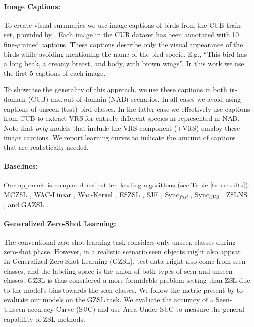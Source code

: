 \documentclass[11pt,a4paper]{article}
\begin{document}
\paragraph{Image Captions:}
To create visual summaries we use image captions of birds from the CUB train-set, provided by \citet{reed2016learning}.  Each image in the CUB dataset has been annotated with 10 fine-grained captions. These captions describe only the visual appearance of the birds while avoiding mentioning the name of the bird specie. E.g., \enquote{This bird has a long beak, a creamy breast, and body, with brown wings}. In this work we use the first 5 captions of each image.


To showcase the generality of this approach, we use these captions in both in-domain (CUB) and out-of-domain (NAB) scenarios. In all cases we avoid using captions of unseen (test) bird classes.  In the latter case we effectively use captions from CUB to extract VRS for entirely-different species in represented in NAB.  Note that {\em only} models that include the VRS component (+VRS) employ these image captions. We report learning curves to indicate the amount of captions that are realistically needed.





\paragraph{Baselines:}  
Our approach is compared asainst ten leading algorithms (see Table \ref{tab:results}): MCZSL \citep{akata2016multi}, WAC-Linear  \citep{elhoseiny2013write}, Wac-Kernel   \citep{elhoseiny2016write}, ESZSL     \citep{romera2015embarrassingly}, SJE   \citep{akata2015evaluation}, Sync$_{fast}$ \citep{changpinyo2016synthesized}, Sync$_{OVO}$ \citep{changpinyo2016synthesized},
ZSLNS \citep{qiao2016less}, and GAZSL \citep{zhu2018generative}. 


\paragraph{Generalized Zero-Shot Learning:} 
The conventional zero-shot learning task considers only unseen classes during zero-shot phase. However, in a realistic scenario seen objects might also appear \cite{chao2016empirical}. In Generalized Zero-Shot Learning (GZSL), test data might also come from seen classes, and the labeling space is the union of both types of seen and unseen classes. GZSL is thus considered a more formidable problem setting
than ZSL due to the model's bias towards the seen classes.
We follow the metric present by \citet{chao2016empirical} to evaluate our models on the GZSL task. We evaluate the accuracy of a Seen-Unseen accuracy Curve (SUC) and use Area Under  SUC to measure the general capability of ZSL methods.
\end{document}

